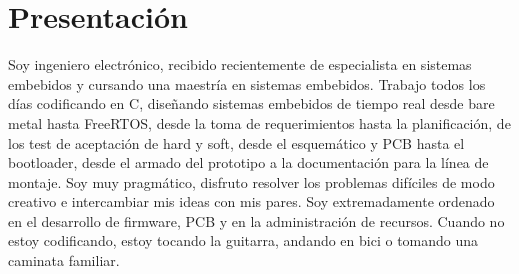 \section{Presentación}
Soy ingeniero electrónico, recibido recientemente de especialista en sistemas
embebidos y cursando una maestría en sistemas embebidos. Trabajo todos los días
codificando en C, diseñando sistemas embebidos de tiempo real desde bare metal
hasta FreeRTOS, desde la toma de requerimientos hasta la planificación, de los
test de aceptación de hard y soft, desde el esquemático y PCB hasta el
bootloader, desde el armado del prototipo a la documentación para la línea de
montaje.  Soy muy pragmático, disfruto resolver los problemas difíciles de modo
creativo e intercambiar mis ideas con mis pares. Soy extremadamente ordenado en
el desarrollo de firmware, PCB y en la administración de recursos.  Cuando no
estoy codificando, estoy tocando la guitarra, andando en bici o tomando una
caminata familiar.
